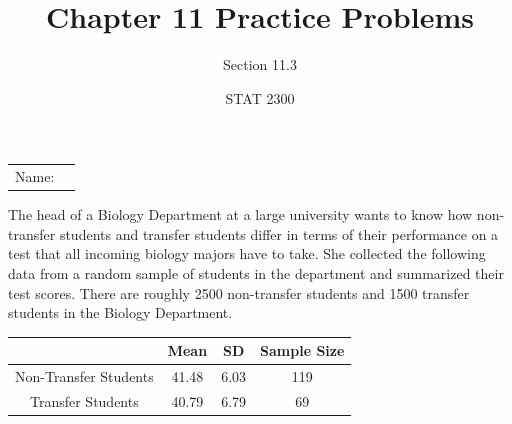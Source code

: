 \documentclass[noanswers]{exam}
\title{Chapter 11 Practice Problems}
\author{Section 11.3}
\date{STAT 2300}
\begin{document}
\noindent\begin{tabular}{@{}p{.3in}p{3in}@{}}
Name: & \hrulefill
\end{tabular}

\vspace{2mm}

\begin{questions} 

\question The head of a Biology Department at a large university wants to know how non-transfer students and transfer students differ in terms of their performance on a test that all incoming biology majors have to take. She collected the following data from a random sample of students in the department and summarized their test scores. There are roughly 2500 non-transfer students and 1500 transfer students in the Biology Department.

\begin{center}
\begin{tabular}{c|c|c|c}
 & \textbf{Mean} & \textbf{SD} & \textbf{Sample Size}\\
\hline
Non-Transfer Students & 41.48 & 6.03 & 119 \\
\hline
Transfer Students & 40.79 & 6.79 & 69
\end{tabular}
\end{center}

\end{questions}
\end{document}
